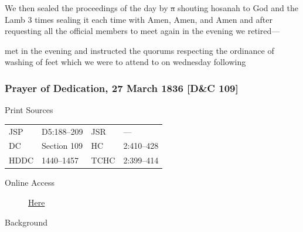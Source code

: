 					We then sealed the proceedings of the day by \sout{a} shouting hosanah to God and the Lamb 3 times sealing it each time with Amen, Amen, and Amen  and after requesting all the official members to meet again in the evening we retired---

					met in the evening and instructed the quorums respecting the ordinance of washing of feet which we were to attend to on wednesday following
					
		\subsubsection{Prayer of Dedication, 27 March 1836 [D\&C 109]}
			\label{EMS-1836-JS-27-MAR-1836}
			
			\begin{description}
					\item[Print Sources]
				\end{description}

					\begin{tabular}{p{0.5in}p{1in}p{0.5in}p{1in}}
					JSP	 	& D5:188--209		& JSR 		& --- \\
					DC	 	& Section 109		& HC 		& 2:410--428 \\
					HDDC 	& 1440--1457		& TCHC 		& 2:399--414 \\
					\end{tabular}
				
				\begin{description}
					\item[Online Access] \href{https://www.josephsmithpapers.org/paper-summary/prayer-of-dedication-27-march-1836-dc-109/1}{Here}
				\end{description}
				
				\begin{description}
					\item[Background]
				\end{description}
				
				
